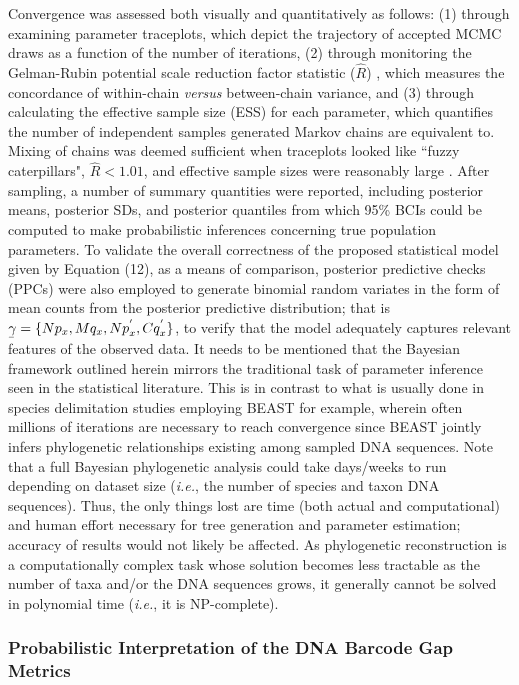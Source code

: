\documentclass[12pt]{article}
\begin{document}
Convergence was assessed both visually and quantitatively as follows: (1) through \\ examining parameter traceplots, which depict the trajectory of accepted MCMC draws as a function of the number of iterations, (2) through monitoring the Gelman-Rubin potential scale reduction factor statistic   ($\hat{R}$)  \citep{gelman1992iterative, vehtari2017rank}, which measures the concordance of within-chain \textit{versus} between-chain variance, and (3) through calculating the effective sample size (ESS) for each parameter, which quantifies the number of independent samples generated Markov chains are equivalent to. Mixing of chains was deemed sufficient when traceplots looked like ``fuzzy caterpillars", $\hat{R} < 1.01$, and effective sample sizes were reasonably large \citep{gelman2020bayesian}.
After sampling, a number of summary quantities were reported, including posterior means, posterior SDs, and posterior quantiles from which 95\% BCIs could be computed to make probabilistic inferences concerning true population parameters. To validate the overall correctness of the proposed statistical model given by Equation (12), as a means of comparison, posterior predictive checks (PPCs) were also employed to generate binomial random variates in the form of mean counts from the posterior predictive distribution; that is $\underaccent{\bar}{\gamma} = \{Np_x, Mq_x, Np^{'}_x, Cq^{'}_x\}$, to verify that the model adequately captures relevant features of the observed data. It needs to be mentioned that the Bayesian framework outlined herein mirrors the traditional task of parameter inference seen in the statistical literature. This is in contrast to what is usually done in species delimitation studies employing BEAST for example, wherein often millions of iterations are necessary to reach convergence since BEAST jointly infers phylogenetic relationships existing among sampled DNA sequences. Note that a full Bayesian phylogenetic analysis could take days/weeks to run depending on dataset size (\textit{i.e.}, the number of species and taxon DNA sequences). Thus, the only things lost are time (both actual and computational) and human effort necessary for tree generation and parameter estimation; accuracy of results would not likely be affected. As phylogenetic reconstruction is a computationally complex task whose solution becomes less tractable as the number of taxa and/or the DNA sequences grows, it generally cannot be solved in polynomial time (\textit{i.e.}, it is NP-complete).

\subsubsection{Probabilistic Interpretation of the DNA Barcode Gap Metrics}
\end{document}
